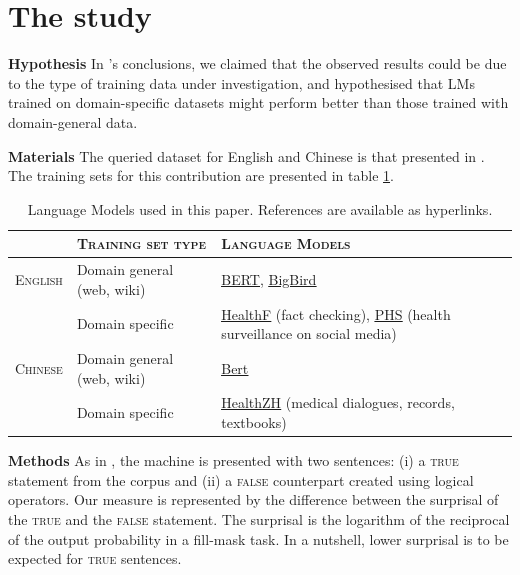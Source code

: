 \documentclass{IOS-Book-Article}
\begin{document}
\vspace{-4mm}
\section{The study}
\textbf{Hypothesis} In \cite{r1}'s conclusions, we claimed that the observed results could be due to the type of training data under investigation, and hypothesised that LMs trained on domain-specific datasets might perform better than those trained with domain-general data.

\noindent \textbf{Materials} The queried dataset for English and Chinese is that presented in \cite{r1}. The training sets for this contribution are presented in table \ref{models}.

\begin{table}[]
    \centering
    \begin{tabular}{l|l|l}
          & \textsc{Training set type} & \textsc{Language Models}\\ \hline
         \textsc{English} & Domain general (web, wiki) & \href{https://huggingface.co/docs/transformers/model_doc/bert}{\underline{BERT}}, \href{https://huggingface.co/docs/transformers/model_doc/big_bird}{\underline{BigBird}}\\
         & Domain specific & \href{https://huggingface.co/austinmw/distilbert-base-uncased-finetuned-health_facts}{\underline{HealthF}} (fact checking), \href{https://huggingface.co/publichealthsurveillance/PHS-BERT}{\underline{PHS}} (health surveillance on social media)\\ \hline
         \textsc{Chinese} & Domain general (web, wiki) & \href{https://huggingface.co/bert-base-chinese}{\underline{Bert}}\\
         & Domain specific & \href{https://huggingface.co/nghuyong/ernie-health-zh}{\underline{HealthZH}} (medical dialogues, records, textbooks)\\ \hline
    \end{tabular}
    \caption{Language Models used in this paper. References are available as hyperlinks.}
    \label{models}
\end{table}

\noindent \textbf{Methods} As in \cite{r1}, the machine is presented with two sentences: (i) a \textsc{true} statement from the corpus and (ii) a \textsc{false} counterpart created using logical operators. Our measure is represented by the difference between the surprisal of the \textsc{true} and the \textsc{false} statement. The surprisal is the logarithm of the reciprocal of the output probability in a fill-mask task. In a nutshell, lower surprisal is to be expected for \textsc{true} sentences.
\end{document}
